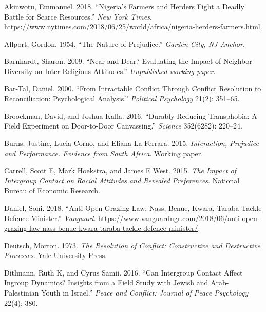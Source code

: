 \documentclass[11pt]{article}
\begin{document}
\hypertarget{refs}{}
\leavevmode\hypertarget{ref-nyt2018nigeria}{}%
Akinwotu, Emmanuel. 2018. ``Nigeria's Farmers and Herders Fight a Deadly
Battle for Scarce Resources.'' \emph{New York Times}.
\url{https://www.nytimes.com/2018/06/25/world/africa/nigeria-herders-farmers.html}.

\leavevmode\hypertarget{ref-allport1954prejudice}{}%
Allport, Gordon. 1954. ``The Nature of Prejudice.'' \emph{Garden City,
NJ Anchor}.

\leavevmode\hypertarget{ref-barnhardt2009near}{}%
Barnhardt, Sharon. 2009. ``Near and Dear? Evaluating the Impact of
Neighbor Diversity on Inter-Religious Attitudes.'' \emph{Unpublished
working paper}.

\leavevmode\hypertarget{ref-bar2000intractable}{}%
Bar-Tal, Daniel. 2000. ``From Intractable Conflict Through Conflict
Resolution to Reconciliation: Psychological Analysis.'' \emph{Political
Psychology} 21(2): 351--65.

\leavevmode\hypertarget{ref-broockman2016durably}{}%
Broockman, David, and Joshua Kalla. 2016. ``Durably Reducing
Transphobia: A Field Experiment on Door-to-Door Canvassing.''
\emph{Science} 352(6282): 220--24.

\leavevmode\hypertarget{ref-burns2015interaction}{}%
Burns, Justine, Lucia Corno, and Eliana La Ferrara. 2015.
\emph{Interaction, Prejudice and Performance. Evidence from South
Africa}. Working paper.

\leavevmode\hypertarget{ref-carrell2015impact}{}%
Carrell, Scott E, Mark Hoekstra, and James E West. 2015. \emph{The
Impact of Intergroup Contact on Racial Attitudes and Revealed
Preferences}. National Bureau of Economic Research.

\leavevmode\hypertarget{ref-daniel2018anti}{}%
Daniel, Soni. 2018. ``Anti-Open Grazing Law: Nass, Benue, Kwara, Taraba
Tackle Defence Minister.'' \emph{Vanguard}.
\url{https://www.vanguardngr.com/2018/06/anti-open-grazing-law-nass-benue-kwara-taraba-tackle-defence-minister/}.

\leavevmode\hypertarget{ref-deutsch1973resolution}{}%
Deutsch, Morton. 1973. \emph{The Resolution of Conflict: Constructive
and Destructive Processes}. Yale University Press.

\leavevmode\hypertarget{ref-ditlmann2016can}{}%
Ditlmann, Ruth K, and Cyrus Samii. 2016. ``Can Intergroup Contact Affect
Ingroup Dynamics? Insights from a Field Study with Jewish and
Arab-Palestinian Youth in Israel.'' \emph{Peace and Conflict: Journal of
Peace Psychology} 22(4): 380.
\end{document}
